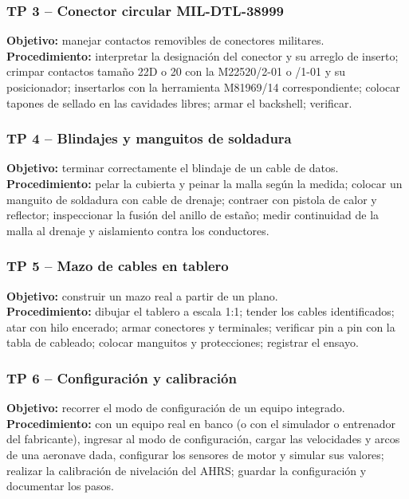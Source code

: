 \subsubsection*{TP 3 -- Conector circular MIL-DTL-38999}
\textbf{Objetivo:} manejar contactos removibles de conectores militares.\\
\textbf{Procedimiento:} interpretar la designación del conector y su arreglo de inserto; crimpar
contactos tamaño 22D o 20 con la M22520/2-01 o /1-01 y su posicionador; insertarlos con la
herramienta M81969/14 correspondiente; colocar tapones de sellado en las cavidades libres; armar el
backshell; verificar.

\subsubsection*{TP 4 -- Blindajes y manguitos de soldadura}
\textbf{Objetivo:} terminar correctamente el blindaje de un cable de datos.\\
\textbf{Procedimiento:} pelar la cubierta y peinar la malla según la medida; colocar un manguito de
soldadura con cable de drenaje; contraer con pistola de calor y reflector; inspeccionar la fusión
del anillo de estaño; medir continuidad de la malla al drenaje y aislamiento contra los
conductores.

\subsubsection*{TP 5 -- Mazo de cables en tablero}
\textbf{Objetivo:} construir un mazo real a partir de un plano.\\
\textbf{Procedimiento:} dibujar el tablero a escala 1:1; tender los cables identificados; atar con
hilo encerado; armar conectores y terminales; verificar pin a pin con la tabla de cableado; colocar
manguitos y protecciones; registrar el ensayo.

\subsubsection*{TP 6 -- Configuración y calibración}
\textbf{Objetivo:} recorrer el modo de configuración de un equipo integrado.\\
\textbf{Procedimiento:} con un equipo real en banco (o con el simulador o entrenador del
fabricante), ingresar al modo de configuración, cargar las velocidades y arcos de una aeronave dada,
configurar los sensores de motor y simular sus valores; realizar la calibración de nivelación del
AHRS; guardar la configuración y documentar los pasos.

